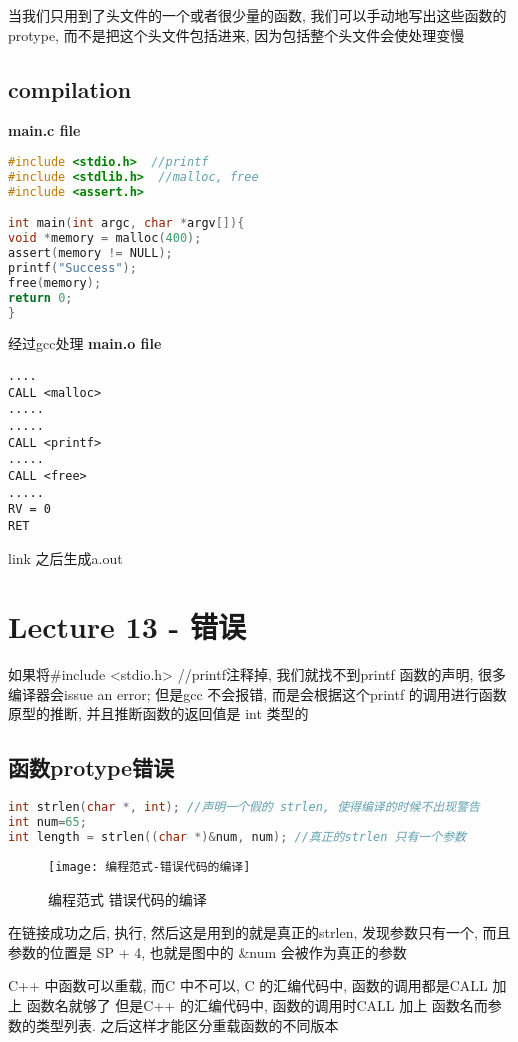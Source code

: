 \documentclass{article}
\begin{document}
当我们只用到了头文件的一个或者很少量的函数, 我们可以手动地写出这些函数的protype, 而不是把这个头文件包括进来, 因为包括整个头文件会使处理变慢

\subsection{compilation}
\textbf{main.c file}\\
\begin{lstlisting}[language = C]
#include <stdio.h>  //printf
#include <stdlib.h>  //malloc, free
#include <assert.h>

int main(int argc, char *argv[]){
void *memory = malloc(400);
assert(memory != NULL);
printf("Success");
free(memory);
return 0;
}
\end{lstlisting}

经过gcc处理
\textbf{main.o file}
\begin{verbatim}
....
CALL <malloc>
.....
.....
CALL <printf>
.....
CALL <free>
.....
RV = 0
RET
\end{verbatim}
link 之后生成a.out

\section{Lecture 13 - 错误}
如果将\#include <stdio.h>  //printf注释掉, 我们就找不到printf 函数的声明, 很多编译器会issue an error; 但是gcc 不会报错, 而是会根据这个printf 的调用进行函数原型的推断, 并且推断函数的返回值是 int 类型的

\subsection{函数protype错误}
\begin{lstlisting}[language = C]
int strlen(char *, int); //声明一个假的 strlen, 使得编译的时候不出现警告
int num=65;
int length = strlen((char *)&num, num); //真正的strlen 只有一个参数
\end{lstlisting}
\begin{figure}[htbp]
	\centering
	\texttt{[image: 编程范式-错误代码的编译]}\\
	\caption{编程范式 错误代码的编译}\label{fig.编程范式.错误代码的编译}
\end{figure}

在链接成功之后, 执行, 然后这是用到的就是真正的strlen, 发现参数只有一个, 而且参数的位置是
SP + 4, 也就是图中的 \&num 会被作为真正的参数

C++ 中函数可以重载, 而C 中不可以,
C 的汇编代码中, 函数的调用都是CALL 加上 函数名就够了
但是C++ 的汇编代码中, 函数的调用时CALL 加上 函数名而参数的类型列表. 之后这样才能区分重载函数的不同版本
\end{document}
